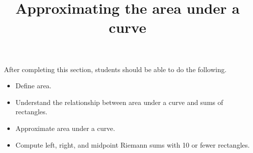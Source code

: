 \documentclass{ximera}
\title{Approximating the area under a curve}
\begin{document}
\begin{abstract}
\end{abstract}

\maketitle

\begin{sectionOutcomes}

After completing this section, students should be able to do the following.
\begin{itemize}
	\item Define area.
	\item Understand the relationship between area under a curve and sums of rectangles.
	\item Approximate area under a curve.
	\item Compute left, right, and midpoint Riemann sums with 10 or fewer rectangles.
\end{itemize}

\end{sectionOutcomes}
\end{document}
